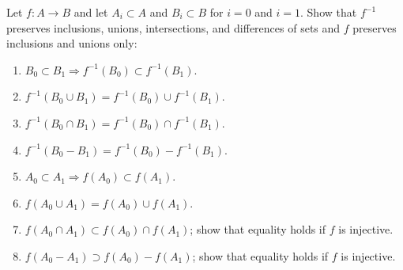 \begin{exercise}\label{chapter1:section2:exercise2}
    Let $f: A\to B$ and let $A_{i}\subset A$ and $B_{i}\subset B$ for $i = 0$ and $i = 1$. Show that $f^{-1}$ preserves inclusions, unions, intersections, and differences of sets and $f$ preserves inclusions and unions only:
    \begin{enumerate}[label={(\alph*)}]
        \item $B_{0}\subset B_{1}\Rightarrow f^{-1}(B_{0})\subset f^{-1}(B_{1})$.
        \item $f^{-1}(B_{0}\cup B_{1}) = f^{-1}(B_{0}) \cup f^{-1}(B_{1})$.
        \item $f^{-1}(B_{0}\cap B_{1}) = f^{-1}(B_{0}) \cap f^{-1}(B_{1})$.
        \item $f^{-1}(B_{0} - B_{1}) = f^{-1}(B_{0}) - f^{-1}(B_{1})$.
        \item $A_{0}\subset A_{1} \Rightarrow f(A_{0}) \subset f(A_{1})$.
        \item $f(A_{0}\cup A_{1}) = f(A_{0})\cup f(A_{1})$.
        \item $f(A_{0}\cap A_{1}) \subset f(A_{0}) \cap f(A_{1})$; show that equality holds if $f$ is injective.
        \item $f(A_{0} - A_{1}) \supset f(A_{0}) - f(A_{1})$; show that equality holds if $f$ is injective.
    \end{enumerate}
\end{exercise}

